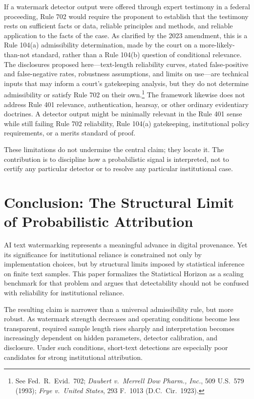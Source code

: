 \documentclass[11pt]{article}
\begin{document}
If a watermark detector output were offered through expert testimony in a federal
proceeding, Rule 702 would require the proponent to establish that the testimony
rests on sufficient facts or data, reliable principles and methods, and reliable
application to the facts of the case. As clarified by the 2023 amendment, this is a
Rule 104(a) admissibility determination, made by the court on a more-likely-than-not
standard, rather than a Rule 104(b) question of conditional relevance. The
disclosures proposed here---text-length reliability curves, stated false-positive and
false-negative rates, robustness assumptions, and limits on use---are technical
inputs that may inform a court's gatekeeping analysis, but they do not determine
admissibility or satisfy Rule 702 on their own.\footnote{See Fed.\ R.\ Evid.\ 702;
\emph{Daubert v.\ Merrell Dow Pharm., Inc.}, 509 U.S.\ 579 (1993); \emph{Frye v.\
United States}, 293 F.\ 1013 (D.C.\ Cir.\ 1923).} The framework likewise does not
address Rule 401 relevance, authentication, hearsay, or other ordinary evidentiary
doctrines. A detector output might be minimally relevant in the Rule 401 sense while
still failing Rule 702 reliability, Rule 104(a) gatekeeping, institutional policy
requirements, or a merits standard of proof.

These limitations do not undermine the central claim; they locate it. The
contribution is to discipline how a probabilistic signal is interpreted, not to
certify any particular detector or to resolve any particular institutional case.

\section{Conclusion: The Structural Limit of Probabilistic Attribution}

AI text watermarking represents a meaningful advance in digital provenance. Yet its
significance for institutional reliance is constrained not only by implementation
choices, but by structural limits imposed by statistical inference on finite text
samples. This paper formalizes the Statistical Horizon as a scaling benchmark for
that problem and argues that detectability should not be confused with reliability for
institutional reliance.

The resulting claim is narrower than a universal admissibility rule, but more robust.
As watermark strength decreases and operating conditions become less transparent,
required sample length rises sharply and interpretation becomes increasingly
dependent on hidden parameters, detector calibration, and disclosure. Under such
conditions, short-text detections are especially poor candidates for strong
institutional attribution.
\end{document}
